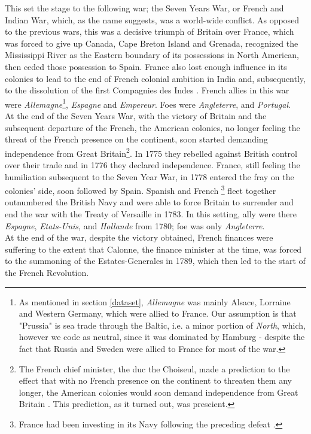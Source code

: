 \documentclass[12pt,a4paper,notitlepage,english]{article}
\begin{document}
This set the stage to the following war; the Seven Years War, or French and Indian War, which, as the name suggests, was a world-wide conflict.
As opposed to the previous wars, this was a decisive triumph of Britain over France, which was forced to give up Canada, Cape Breton Island and Grenada, recognized the Mississippi River as the Eastern boundary of its possessions in North American, then ceded those possession to Spain.
France also lost enough influence in its colonies to lead to the end of French colonial ambition in India and, subsequently, to the dissolution of the first Compagnies des Indes \citep{riley_seven_1986}.
French allies in this war were \textit{Allemagne}\footnote{As mentioned in section \ref{dataset}, \textit{Allemagne} was mainly Alsace, Lorraine and Western Germany, which were allied to France.
Our assumption is that "Prussia" is sea trade through the Baltic, i.e. a minor portion of \textit{North}, which, however we code as neutral, since it was dominated by Hamburg - despite the fact that Russia and Sweden were allied to France for most of the war.}, \textit{Espagne} and \textit{Empereur}.
Foes were \textit{Angleterre}, and \textit{Portugal}. \\
At the end of the Seven Years War, with the victory of Britain and the subsequent departure of the French, the American colonies, no longer feeling the threat of the French presence on the continent, soon started demanding independence from Great Britain\footnote{The French chief minister, the duc the Choiseul, made a prediction to the effect that with no French presence on the continent to threaten them any longer, the American colonies would soon demand independence from Great Britain \citep{findlay2009power}.
This prediction, as it turned out, was prescient.}.
In 1775 they rebelled against British control over their trade and in 1776 they declared independence.
France, still feeling the humiliation subsequent to the Seven Year War, in 1778 entered the fray on the colonies' side, soon followed by Spain.
Spanish and French \footnote{France had been investing in its Navy following the preceding defeat \citep{findlay2009power}.} fleet together outnumbered the British Navy and were able to force Britain to surrender and end the war with the Treaty of Versaille in 1783.
In this setting, ally were there \textit{Espagne}, \textit{Etats-Unis}, and \textit{Hollande} from 1780; foe was only \textit{Angleterre}. \\
At the end of the war, despite the victory obtained, French finances were suffering to the extent that Calonne, the finance minister at the time, was forced to the summoning of the Estates-Generales in 1789, which then led to the start of the French Revolution.
\end{document}
